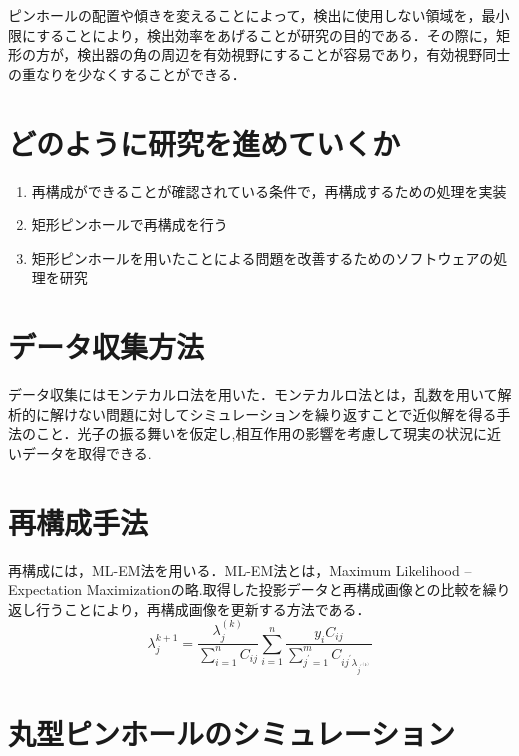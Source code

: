 \documentclass[dvipdfmx,autodetect-engine,twocolumn,10pt]{jsarticle}%
\begin{document}
\newpage
ピンホールの配置や傾きを変えることによって，検出に使用しない領域を，最小限にすることにより，検出効率をあげることが研究の目的である．その際に，矩形の方が，検出器の角の周辺を有効視野にすることが容易であり，有効視野同士の重なりを少なくすることができる．

\section{どのように研究を進めていくか}
\begin{enumerate}
  \item 再構成ができることが確認されている条件で，再構成するための処理を実装
  \item 矩形ピンホールで再構成を行う
  \item 矩形ピンホールを用いたことによる問題を改善するためのソフトウェアの処理を研究

\end{enumerate}

\section{データ収集方法}
データ収集にはモンテカルロ法を用いた．モンテカルロ法とは，乱数を用いて解析的に解けない問題に対してシミュレーションを繰り返すことで近似解を得る手法のこと．光子の振る舞いを仮定し,相互作用の影響を考慮して現実の状況に近いデータを取得できる.


\section{再構成手法}
再構成には，ML-EM法を用いる．ML-EM法とは，Maximum Likelihood – Expectation Maximizationの略.取得した投影データと再構成画像との比較を繰り返し行うことにより，再構成画像を更新する方法である．
\[
  \lambda_j^{k+1}=\frac{\lambda_j^{(k)}}{\sum_{i=1}^{n} C_{ij}}\sum_{i=1}^{n} \frac{y_iC_{ij}}{\sum_{j^{\prime}=1}^{m}C_{ij^{\prime}\lambda_{j^{\prime}^{(k)}}}}
\]


\section{丸型ピンホールのシミュレーション}
\end{document}
